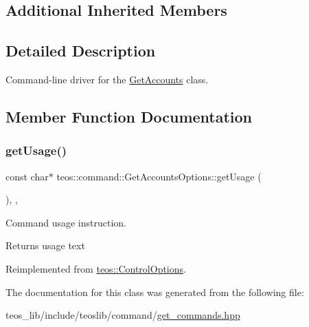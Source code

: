 \subsection*{Additional Inherited Members}


\subsection{Detailed Description}
Command-\/line driver for the \mbox{\hyperlink{classteos_1_1command_1_1_get_accounts}{Get\+Accounts}} class. 

\subsection{Member Function Documentation}
\mbox{\label{classteos_1_1command_1_1_get_accounts_options_ac93b806fa601124aa899474da62d1288}} 
\subsubsection{\texorpdfstring{get\+Usage()}{getUsage()}}
{\footnotesize\ttfamily const char$\ast$ teos\+::command\+::\+Get\+Accounts\+Options\+::get\+Usage (\begin{DoxyParamCaption}{ }\end{DoxyParamCaption})\hspace{0.3cm}{\ttfamily [inline]}, {\ttfamily [protected]}, {\ttfamily [virtual]}}



Command \textquotesingle{}usage\textquotesingle{} instruction. 

\begin{DoxyReturn}{Returns}
usage text 
\end{DoxyReturn}


Reimplemented from \mbox{\hyperlink{classteos_1_1_control_options_a0aa5671f9bc750ed5280c26c543874f3}{teos\+::\+Control\+Options}}.



The documentation for this class was generated from the following file\+:\begin{DoxyCompactItemize}
\item 
teos\+\_\+lib/include/teoslib/command/\mbox{\hyperlink{get__commands_8hpp}{get\+\_\+commands.\+hpp}}\end{DoxyCompactItemize}
